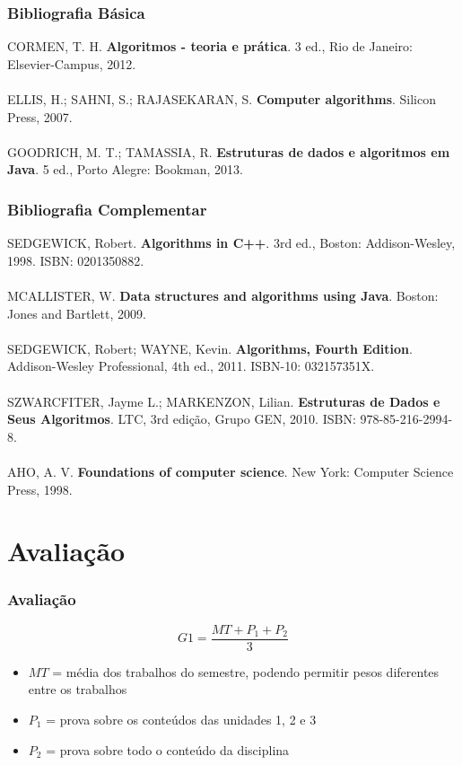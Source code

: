 \documentclass[aspectratio=169]{beamer}
\begin{document}
\begin{frame}\frametitle{Bibliografia Básica}
CORMEN, T. H. \textbf{Algoritmos - teoria e prática}. 3 ed., Rio de Janeiro: Elsevier-Campus, 2012.\\
~\\
ELLIS, H.; SAHNI, S.; RAJASEKARAN, S. \textbf{Computer algorithms}. Silicon Press, 2007.\\
~\\
GOODRICH, M. T.; TAMASSIA, R. \textbf{Estruturas de dados e algoritmos em Java}. 5 ed., Porto Alegre: Bookman, 2013.
\end{frame}

\begin{frame}\frametitle{Bibliografia Complementar}
SEDGEWICK, Robert. \textbf{Algorithms in C++}. 3rd ed., Boston: Addison-Wesley, 1998. ISBN: 0201350882.\\
~\\
MCALLISTER, W. \textbf{Data structures and algorithms using Java}. Boston: Jones and Bartlett, 2009.\\
~\\
SEDGEWICK, Robert; WAYNE, Kevin. \textbf{Algorithms, Fourth Edition}. Addison-Wesley Professional, 4th ed., 2011. ISBN-10: 032157351X.\\
~\\
SZWARCFITER, Jayme L.; MARKENZON, Lilian.
\textbf{Estruturas de Dados e Seus Algoritmos}.
LTC, 3rd edição, Grupo GEN, 2010.
ISBN: 978-85-216-2994-8.\\
~\\
AHO, A. V. \textbf{Foundations of computer science}. New York: Computer Science Press, 1998.
\end{frame}

\section{Avalia\c{c}\~ao}

\begin{frame}\frametitle{Avalia\c{c}\~ao}
\[
G1 = \frac{MT  + P_1 + P_2}{3}
\]
\begin{itemize}
	\item $MT$ = média dos trabalhos do semestre, podendo permitir pesos diferentes entre os trabalhos
	\item $P_1$ = prova sobre os conteúdos das unidades 1, 2 e 3
	\item $P_2$ = prova sobre todo o conteúdo da disciplina
\end{itemize}
\end{frame}
	
\end{document}
